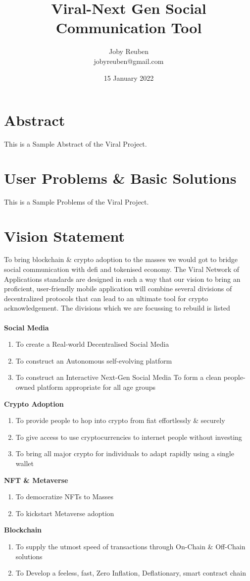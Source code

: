 \documentclass[10pt]{article}
\title{Viral-Next Gen Social Communication Tool}
\date{15 January 2022}
\author{Joby Reuben\\jobyreuben@gmail.com}
\begin{document}
\maketitle

\section{Abstract}
This is a Sample Abstract of the Viral Project.

\section{User Problems \& Basic Solutions}
This is a Sample Problems of the Viral Project.

\section{Vision Statement}
To bring blockchain \& crypto adoption to the masses we would got to bridge social communication with defi and tokenised economy. The Viral Network of Applications standards are designed in such a way that our vision to bring an proficient, user-friendly mobile application will combine several divisions of decentralized protocols that can lead to an ultimate tool for crypto acknowledgement. The divisions which we are focussing to rebuild is listed\\
\\
\textbf{\large Social Media}
\begin{enumerate}
\item To create a Real-world Decentralised Social Media
\item To construct an Autonomous self-evolving platform
\item To construct an Interactive Next-Gen Social Media
To form a clean people-owned platform appropriate for all age groups
\end{enumerate}
\textbf{\large Crypto Adoption}
\begin{enumerate}
\item To provide people to hop into crypto from fiat effortlessly \& securely
\item To give access to use cryptocurrencies to internet people without investing
\item To bring all major crypto for individuals to adapt rapidly using a single wallet
\end{enumerate}
\textbf{\large NFT \& Metaverse}
\begin{enumerate}
\item To democratize NFTs to Masses
\item To kickstart Metaverse adoption
\end{enumerate}
\textbf{\large Blockchain}
\begin{enumerate}
\item To supply the utmost speed of transactions through On-Chain \& Off-Chain solutions
\item To Develop a feeless, fast, Zero Inflation, Deflationary, smart contract chain
\end{enumerate}
\end{document}
